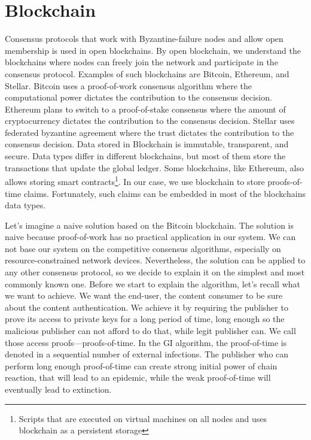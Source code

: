 
\chapter{Blockchain}
Consensus protocols that work with Byzantine-failure nodes and allow open membership is used in open blockchains. By open blockchain, we understand the blockchains where nodes can freely join the network and participate in the consensus protocol. Examples of such blockchains are Bitcoin, Ethereum, and Stellar. Bitcoin uses a proof-of-work consensus algorithm where the computational power dictates the contribution to the consensus decision. Ethereum plans to switch to a proof-of-stake consensus where the amount of cryptocurrency dictates the contribution to the consensus decision. Stellar uses federated byzantine agreement where the trust dictates the contribution to the consensus decision. Data stored in Blockchain is immutable, transparent, and secure. Data types differ in different blockchains, but most of them store the transactions that update the global ledger. Some blockchains, like Ethereum, also allows storing smart contracts\footnote{Scripts that are executed on virtual machines on all nodes and uses blockchain as a persistent storage}. In our case, we use blockchain to store proofs-of-time claims. Fortunately, such claims can be embedded in most of the blockchains data types.

Let's imagine a naive solution based on the Bitcoin blockchain. The solution is naive because proof-of-work has no practical application in our system. We can not base our system on the competitive consensus algorithms, especially on resource-constrained network devices. Nevertheless, the solution can be applied to any other consensus protocol, so we decide to explain it on the simplest and most commonly known one. 
Before we start to explain the algorithm, let's recall what we want to achieve. We want the end-user, the content consumer to be sure about the content authentication. We achieve it by requiring the publisher to prove its access to private keys for a long period of time, long enough so the malicious publisher can not afford to do that, while legit publisher can. We call those access proofs––proofs-of-time. In the GI algorithm, the proof-of-time is denoted in a sequential number of external infections. The publisher who can perform long enough proof-of-time can create strong initial power of chain reaction, that will lead to an epidemic, while the weak proof-of-time will eventually lead to extinction. 

